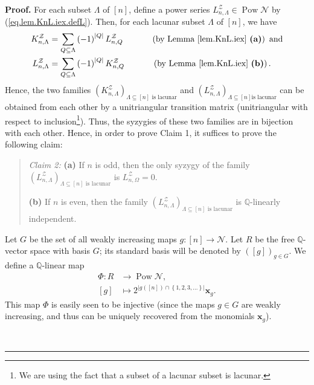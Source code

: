 \documentclass[numbers=enddot,12pt,final,onecolumn,notitlepage]{scrartcl}%
\theoremstyle{definition}
\newenvironment{statement}{\begin{quote}}{\end{quote}}
\newenvironment{proof}[1][Proof]{\noindent\textbf{#1.} }{\ \rule{0.5em}{0.5em}}
\newenvironment{verlong}{}{}
\let\sumnonlimits\sum
\renewcommand{\sum}{\sumnonlimits\limits}
\begin{document}
\begin{verlong}
\begin{proof}
For each subset $\Lambda$ of $\left[  n\right]  $, define a power series
$L_{n,\Lambda}^{\mathcal{Z}}\in\operatorname*{Pow}\mathcal{N}$ by
(\ref{eq.lem.KnL.iex.defL}). Then, for each lacunar subset $\Lambda$ of
$\left[  n\right]  $, we have%
\begin{align*}
K_{n,\Lambda}^{\mathcal{Z}}  &  =\sum_{Q\subseteq\Lambda}\left(  -1\right)
^{\left\vert Q\right\vert }L_{n,Q}^{\mathcal{Z}}\ \ \ \ \ \ \ \ \ \ \left(
\text{by Lemma \ref{lem.KnL.iex} \textbf{(a)}}\right)  \text{ and}\\
L_{n,\Lambda}^{\mathcal{Z}}  &  =\sum_{Q\subseteq\Lambda}\left(  -1\right)
^{\left\vert Q\right\vert }K_{n,Q}^{\mathcal{Z}}\ \ \ \ \ \ \ \ \ \ \left(
\text{by Lemma \ref{lem.KnL.iex} \textbf{(b)}}\right)  .
\end{align*}
Hence, the two families $\left(  K_{n,\Lambda}^{\mathcal{Z}}\right)
_{\Lambda\subseteq\left[  n\right]  \text{ is lacunar}}$ and $\left(
L_{n,\Lambda}^{\mathcal{Z}}\right)  _{\Lambda\subseteq\left[  n\right]  \text{
is lacunar}}$ can be obtained from each other by a unitriangular transition
matrix (unitriangular with respect to inclusion\footnote{We are using the fact
that a subset of a lacunar subset is lacunar.}). Thus, the syzygies of these
two families are in bijection with each other. Hence, in order to prove Claim
1, it suffices to prove the following claim:

\begin{statement}
\textit{Claim 2:} \textbf{(a)} If $n$ is odd, then the only syzygy of the
family $\left(  L_{n,\Lambda}^{\mathcal{Z}}\right)  _{\Lambda\subseteq\left[
n\right]  \text{ is lacunar}}$ is $L_{n,\Omega}^{\mathcal{Z}}=0$.

\textbf{(b)} If $n$ is even, then the family $\left(  L_{n,\Lambda
}^{\mathcal{Z}}\right)  _{\Lambda\subseteq\left[  n\right]  \text{ is
lacunar}}$ is $\mathbb{Q}$-linearly independent.
\end{statement}

Let $G$ be the set of all weakly increasing maps $g:\left[  n\right]
\rightarrow\mathcal{N}$. Let $R$ be the free $\mathbb{Q}$-vector space with
basis $G$; its standard basis will be denoted by $\left(  \left[  g\right]
\right)  _{g\in G}$. We define a $\mathbb{Q}$-linear map%
\begin{align*}
\Phi:R  &  \rightarrow\operatorname*{Pow}\mathcal{N},\\
\left[  g\right]   &  \mapsto2^{\left\vert g\left(  \left[  n\right]  \right)
\cap\left\{  1,2,3,\ldots\right\}  \right\vert }\mathbf{x}_{g}.
\end{align*}
This map $\Phi$ is easily seen to be injective (since the maps $g\in G$ are
weakly increasing, and thus can be uniquely recovered from the monomials
$\mathbf{x}_{g}$).


\end{proof}
\end{verlong}
\end{document}
